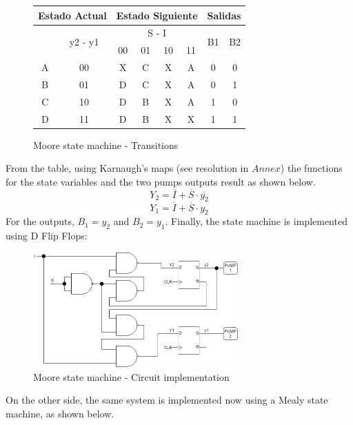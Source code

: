 \begin{figure}[H]
\begin{centering}
\begin{tabular}{|c|c|c|c|c|c||c|c|}
    \hline 
    \multicolumn{2}{|c|}{Estado Actual} & \multicolumn{4}{c||}{Estado Siguiente} & \multicolumn{2}{c|}{Salidas}\tabularnewline
    \hline 
    \hline 
    \multirow{2}{*}{} & \multirow{2}{*}{y2 - y1} & \multicolumn{4}{c||}{S - I} & \multirow{2}{*}{B1} & \multirow{2}{*}{B2}\tabularnewline
    \cline{3-6} 
     &  & 00 & 01 & 10 & 11 &  & \tabularnewline
    \hline 
    A & 00 & X & C & X & A & 0 & 0\tabularnewline
    \hline 
    B & 01 & D & C & X & A & 0 & 1\tabularnewline
    \hline 
    C & 10 & D & B & X & A & 1 & 0\tabularnewline
    \hline 
    D & 11 & D & B & X & X & 1 & 1\tabularnewline
    \hline 
    \end{tabular}
    \caption{Moore state machine - Transitions}
\end{centering}
\end{figure}

\newpage

From the table, using Karnaugh's maps (see resolution in $Annex$) the 
functions for the state variables and the 
two pumps outputs result as shown below.
$$Y_2 = \overline{I} + \overline{S} \cdot \overline{y_2}$$ 
$$Y_1 = \overline{I} + \overline{S} \cdot y_2$$ 
For the outputs, $B_1 = y_2$ and $B_2 = y_1$.  
Finally, the state machine is implemented using 
D Flip Flops:

\begin{figure}[H]
    \begin{centering}
    \includegraphics[width=0.7\textwidth]{data/Graficos1/1a_Compuertas_Moore.png}
    \par\end{centering}
    \caption{Moore state machine - Circuit implementation}
\end{figure}

On the other side, the same system is implemented 
now using a Mealy state machine, as shown below.

